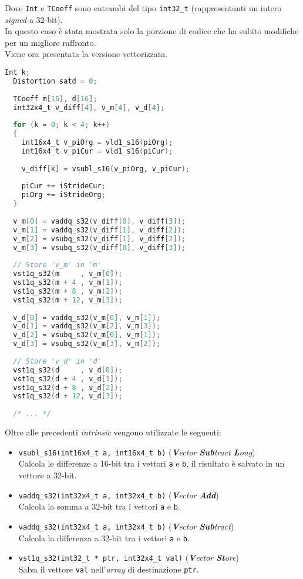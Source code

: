 Dove \verb|Int| e \verb|TCoeff| sono entrambi del tipo \verb|int32_t| 
(rappresentanti un intero \emph{signed} a 32-bit).\\

In questo caso è stata mostrata solo la porzione di codice che ha subito 
modifiche per un migliore raffronto.\\

Viene ora presentata la versione vettorizzata.

\begin{lstlisting}[language=C]
  Int k;
  Distortion satd = 0;
  
  TCoeff m[16], d[16];
  int32x4_t v_diff[4], v_m[4], v_d[4];
  
  for (k = 0; k < 4; k++)
  {
    int16x4_t v_piOrg = vld1_s16(piOrg);
    int16x4_t v_piCur = vld1_s16(piCur);
    
    v_diff[k] = vsubl_s16(v_piOrg, v_piCur);
  
    piCur += iStrideCur;
    piOrg += iStrideOrg;
  }
  
  v_m[0] = vaddq_s32(v_diff[0], v_diff[3]);
  v_m[1] = vaddq_s32(v_diff[1], v_diff[2]);
  v_m[2] = vsubq_s32(v_diff[1], v_diff[2]);
  v_m[3] = vsubq_s32(v_diff[0], v_diff[3]);
  
  // Store 'v_m' in 'm'
  vst1q_s32(m     , v_m[0]);
  vst1q_s32(m + 4 , v_m[1]);
  vst1q_s32(m + 8 , v_m[2]);
  vst1q_s32(m + 12, v_m[3]);
  
  v_d[0] = vaddq_s32(v_m[0], v_m[1]);
  v_d[1] = vaddq_s32(v_m[2], v_m[3]);
  v_d[2] = vsubq_s32(v_m[0], v_m[1]);
  v_d[3] = vsubq_s32(v_m[3], v_m[2]);
  
  // Store 'v_d' in 'd'
  vst1q_s32(d     , v_d[0]);
  vst1q_s32(d + 4 , v_d[1]);
  vst1q_s32(d + 8 , v_d[2]);
  vst1q_s32(d + 12, v_d[3]);
  
  /* ... */
\end{lstlisting}

Oltre alle precedenti \emph{intrinsic} vengono utilizzate le seguenti:

\begin{itemize}
  \item \verb|vsubl_s16(int16x4_t a, int16x4_t b)| (\emph{\textbf{V}ector 
    \textbf{Sub}tract \textbf{L}ong})\\
      Calcola le differenze a 16-bit tra i vettori \verb|a| e \verb|b|, il 
      risultato è salvato in un vettore a 32-bit.
  \item \verb|vaddq_s32(int32x4_t a, int32x4_t b)| (\emph{\textbf{V}ector 
    \textbf{Add}})\\
      Calcola la somma a 32-bit tra i vettori \verb|a| e \verb|b|.
  \item \verb|vaddq_s32(int32x4_t a, int32x4_t b)| (\emph{\textbf{V}ector 
    \textbf{Sub}tract})\\
      Calcola la differenza a 32-bit tra i vettori \verb|a| e \verb|b|.
  \item \verb|vst1q_s32(int32_t * ptr, int32x4_t val)| (\emph{\textbf{V}ector 
    \textbf{St}ore})\\
      Salva il vettore \verb|val| nell'\emph{array} di destinazione \verb|ptr|.
\end{itemize}

